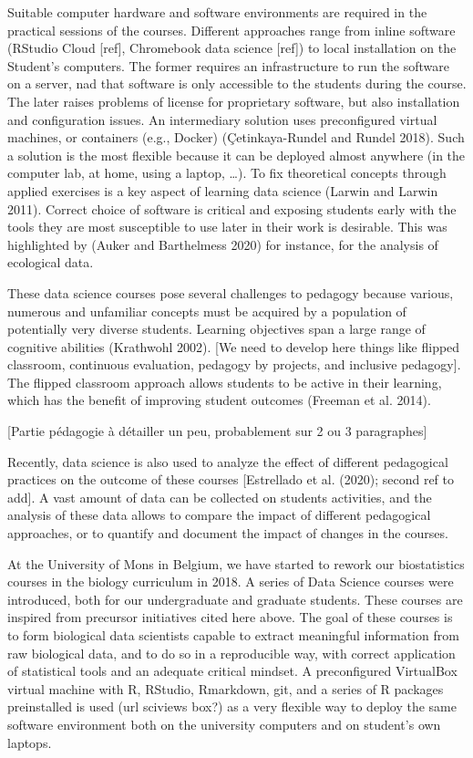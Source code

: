 \documentclass[
]{article}
\begin{document}
Suitable computer hardware and software environments are required in the
practical sessions of the courses. Different approaches range from
inline software (RStudio Cloud {[}ref{]}, Chromebook data science
{[}ref{]}) to local installation on the Student's computers. The former
requires an infrastructure to run the software on a server, nad that
software is only accessible to the students during the course. The later
raises problems of license for proprietary software, but also
installation and configuration issues. An intermediary solution uses
preconfigured virtual machines, or containers (e.g., Docker)
(Çetinkaya-Rundel and Rundel 2018). Such a solution is the most flexible
because it can be deployed almost anywhere (in the computer lab, at
home, using a laptop, \ldots). To fix theoretical concepts through
applied exercises is a key aspect of learning data science (Larwin and
Larwin 2011). Correct choice of software is critical and exposing
students early with the tools they are most susceptible to use later in
their work is desirable. This was highlighted by (Auker and Barthelmess
2020) for instance, for the analysis of ecological data.

These data science courses pose several challenges to pedagogy because
various, numerous and unfamiliar concepts must be acquired by a
population of potentially very diverse students. Learning objectives
span a large range of cognitive abilities (Krathwohl 2002). {[}We need
to develop here things like flipped classroom, continuous evaluation,
pedagogy by projects, and inclusive pedagogy{]}. The flipped classroom
approach allows students to be active in their learning, which has the
benefit of improving student outcomes (Freeman et al. 2014).

{[}Partie pédagogie à détailler un peu, probablement sur 2 ou 3
paragraphes{]}

Recently, data science is also used to analyze the effect of different
pedagogical practices on the outcome of these courses {[}Estrellado et
al. (2020); second ref to add{]}. A vast amount of data can be collected
on students activities, and the analysis of these data allows to compare
the impact of different pedagogical approaches, or to quantify and
document the impact of changes in the courses.

At the University of Mons in Belgium, we have started to rework our
biostatistics courses in the biology curriculum in 2018. A series of
Data Science courses were introduced, both for our undergraduate and
graduate students. These courses are inspired from precursor initiatives
cited here above. The goal of these courses is to form biological data
scientists capable to extract meaningful information from raw biological
data, and to do so in a reproducible way, with correct application of
statistical tools and an adequate critical mindset. A preconfigured
VirtualBox virtual machine with R, RStudio, Rmarkdown, git, and a series
of R packages preinstalled is used (url sciviews box?) as a very
flexible way to deploy the same software environment both on the
university computers and on student's own laptops.
\end{document}
